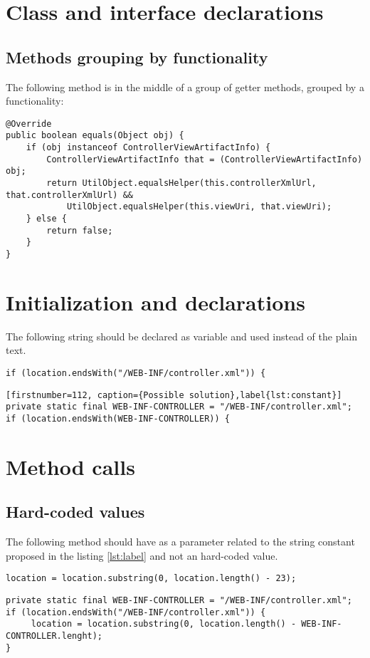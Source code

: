 \section{Class and interface declarations}
\subsection{Methods grouping by functionality}
The following method is in the middle of a group of getter methods, grouped by a functionality:
\begin{lstlisting}[firstnumber=113, caption={equals method in the middle of getters}]
@Override
public boolean equals(Object obj) {
    if (obj instanceof ControllerViewArtifactInfo) {
        ControllerViewArtifactInfo that = (ControllerViewArtifactInfo) obj;
        return UtilObject.equalsHelper(this.controllerXmlUrl, that.controllerXmlUrl) &&
            UtilObject.equalsHelper(this.viewUri, that.viewUri);
    } else {
        return false;
    }
}
\end{lstlisting}

\section{Initialization and declarations}
The following string should be declared as  variable and used instead of the plain text.
\begin{lstlisting}[firstnumber=113, caption={Constant is missing}]
if (location.endsWith("/WEB-INF/controller.xml")) {
\end{lstlisting}
\begin{lstlisting}[firstnumber=112, caption={Possible solution},label{lst:constant}]
private static final WEB-INF-CONTROLLER = "/WEB-INF/controller.xml";
if (location.endsWith(WEB-INF-CONTROLLER)) {
\end{lstlisting}

\section{Method calls}

\subsection{Hard-coded values}
The following method should have as  a parameter related to the string constant proposed in the listing \ref{lst:label} and not an hard-coded value.
\begin{lstlisting}[firstnumber=88, caption={substring invocation}]
location = location.substring(0, location.length() - 23);
\end{lstlisting}
\begin{lstlisting}[firstnumber=86, caption={substring invocation possible solution}]
private static final WEB-INF-CONTROLLER = "/WEB-INF/controller.xml";
if (location.endsWith("/WEB-INF/controller.xml")) {
     location = location.substring(0, location.length() - WEB-INF-CONTROLLER.lenght);
}
\end{lstlisting}
